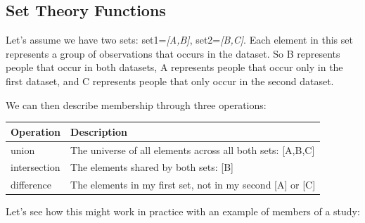 \documentclass[]{book}
\newenvironment{Shaded}{\begin{snugshade}}{\end{snugshade}}
\newcommand{\KeywordTok}[1]{\textcolor[rgb]{0.13,0.29,0.53}{\textbf{#1}}}
\newcommand{\NormalTok}[1]{#1}
\newcommand{\OperatorTok}[1]{\textcolor[rgb]{0.81,0.36,0.00}{\textbf{#1}}}
\newcommand{\StringTok}[1]{\textcolor[rgb]{0.31,0.60,0.02}{#1}}
\theoremstyle{definition}
\theoremstyle{definition}
\theoremstyle{definition}
\theoremstyle{remark}
\begin{document}
\hypertarget{set-theory-functions}{%
\subsection{Set Theory Functions}\label{set-theory-functions}}

Let's assume we have two sets: set1=\emph{{[}A,B{]}},
set2=\emph{{[}B,C{]}}. Each element in this set represents a group of
observations that occurs in the dataset. So B represents people that
occur in both datasets, A represents people that occur only in the first
dataset, and C represents people that only occur in the second dataset.

We can then describe membership through three operations:

\begin{longtable}[]{@{}ll@{}}
\toprule
Operation & Description\tabularnewline
\midrule
\endhead
union & The universe of all elements across all both sets:
{[}A,B,C{]}\tabularnewline
intersection & The elements shared by both sets: {[}B{]}\tabularnewline
difference & The elements in my first set, not in my second {[}A{]} or
{[}C{]}\tabularnewline
\bottomrule
\end{longtable}

Let's see how this might work in practice with an example of members of
a study:

\begin{Shaded}
\end{Shaded}
\end{document}
